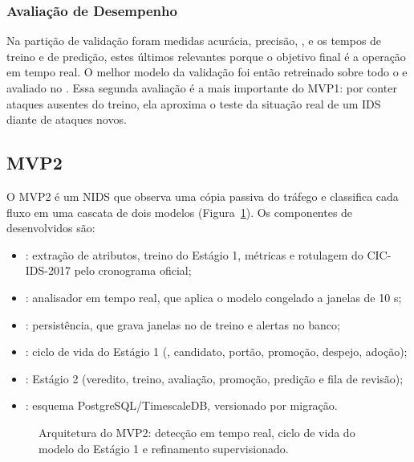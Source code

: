 \subsubsection{Avaliação de Desempenho}

Na partição de validação foram medidas acurácia, precisão, ,
 e os tempos de treino e de predição, estes últimos relevantes porque
o objetivo final é a operação em tempo real. O melhor modelo da validação foi então
retreinado sobre todo o  e avaliado no . Essa segunda
avaliação é a mais importante do MVP1: por conter ataques ausentes do treino, ela
aproxima o teste da situação real de um IDS diante de ataques novos.

\subsection{MVP2}
\label{sec:mvp2}

O MVP2 é um NIDS que observa uma cópia passiva do tráfego e classifica cada fluxo
em uma cascata de dois modelos (Figura~\ref{fig:arquitetura}). Os componentes de
 desenvolvidos são:

\begin{itemize}
  \item {}: extração de atributos, treino do Estágio 1, métricas e
  rotulagem do CIC-IDS-2017 pelo cronograma oficial;
  \item {}: analisador em tempo real, que aplica o modelo
  congelado a janelas de 10 s;
  \item {}: persistência, que grava janelas no  de treino e
  alertas no banco;
  \item {}: ciclo de vida do Estágio 1 (, candidato,
  portão, promoção, despejo, adoção);
  \item {}: Estágio 2 (veredito, treino, avaliação, promoção,
  predição e fila de revisão);
  \item {}: esquema PostgreSQL/TimescaleDB, versionado por migração.
\end{itemize}

\begin{figure}[t]
  \centering
  \resizebox{\textwidth}{!}{}
  \caption{Arquitetura do MVP2: detecção em tempo real, ciclo de vida do modelo do Estágio 1 e refinamento supervisionado.}
  \label{fig:arquitetura}
\end{figure}

